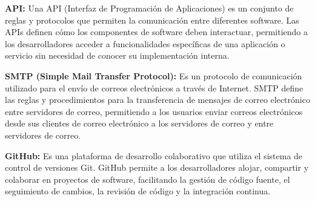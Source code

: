 \begin{description}
  \item \textbf{API:} Una API (Interfaz de Programación de Aplicaciones) es un conjunto de reglas y protocolos que permiten la comunicación entre diferentes software. Las APIs definen cómo los componentes de software deben interactuar, permitiendo a los desarrolladores acceder a funcionalidades específicas de una aplicación o servicio sin necesidad de conocer su implementación interna.

  \item \textbf{SMTP (Simple Mail Transfer Protocol):} Es un protocolo de comunicación utilizado para el envío de correos electrónicos a través de Internet. SMTP define las reglas y procedimientos para la transferencia de mensajes de correo electrónico entre servidores de correo, permitiendo a los usuarios enviar correos electrónicos desde sus clientes de correo electrónico a los servidores de correo y entre servidores de correo.

  \item \textbf{GitHub:} Es una plataforma de desarrollo colaborativo que utiliza el sistema de control de versiones Git. GitHub permite a los desarrolladores alojar, compartir y colaborar en proyectos de software, facilitando la gestión de código fuente, el seguimiento de cambios, la revisión de código y la integración continua.
\end{description}

